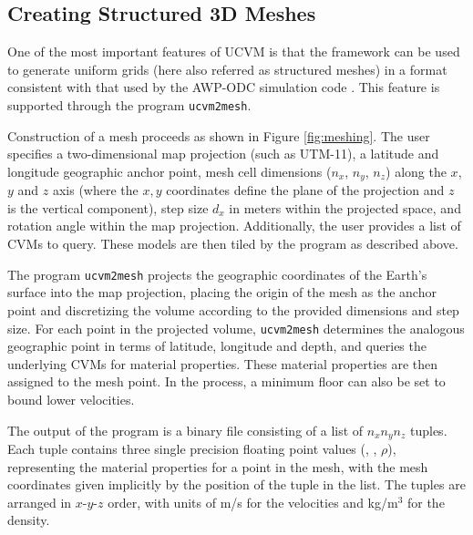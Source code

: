 


\subsection{Creating Structured 3D Meshes}

One of the most important features of UCVM is that the framework can be used to generate uniform grids (here also referred as structured meshes) in a format consistent with that used by the AWP-ODC simulation code \citep{Cui_2010_Proc}. This feature is supported through the program \texttt{ucvm2mesh}.

Construction of a mesh proceeds as shown in Figure \ref{fig:meshing}. The user specifies a two-dimensional map projection (such as UTM-11), a latitude and longitude geographic anchor point, mesh cell dimensions ($n_x$, $n_y$, $n_z$) along the $x$, $y$ and $z$ axis (where the $x,y$ coordinates define the plane of the projection and $z$ is the vertical component), step size $d_x$ in meters within the projected space, and rotation angle within the map projection. Additionally, the user provides a list of CVMs to query. These models are then tiled by the program as described above.

The program \texttt{ucvm2mesh} projects the geographic coordinates of the Earth's surface into the map projection, placing the origin of the mesh as the anchor point and discretizing the volume according to the provided dimensions and step size. For each point in the projected volume, \texttt{ucvm2mesh} determines the analogous geographic point in terms of latitude, longitude and depth, and queries the underlying CVMs for material properties. These material properties are then assigned to the mesh point. In the process, a minimum \vs{} floor can also be set to bound lower velocities.

The output of the program is a binary file consisting of a list of $n_xn_yn_z$ tuples. Each tuple contains three single precision floating point values (\vp{}, \vs{}, $\rho$), representing the material properties for a point in the mesh, with the mesh coordinates given implicitly by the position of the tuple in the list. The tuples are arranged in $x$-$y$-$z$ order, with units of m/s for the velocities and kg/m$^3$ for the density.

